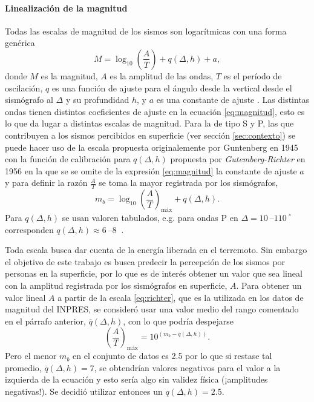 \documentclass[a4paper]{report}
\begin{document}
\paragraph{Linealización de la magnitud}
Todas las escalas de magnitud de los sismos son logarítmicas con una forma genérica
\begin{equation}
	M = \log_{10} \left( \frac{A}{T} \right) + q(\Delta, h) + a,
	\label{eq:magnitud}
\end{equation}
donde \(M\) es la magnitud, \(A\) es la amplitud de las ondas, \(T\) es el período de oscilación, \(q\) es una función de ajuste para el ángulo desde la vertical desde el sismógrafo al \(\Delta\) y su profundidad \(h\), y \(a\) es una constante de ajuste \cite[ecuación 4.13]{fowler_solid_1990}.
Las distintas ondas tienen distintos coeficientes de ajuste en la ecuación \ref{eq:magnitud}, esto es lo que da lugar a distintas escalas de magnitud.
Para la de tipo S y P, las que contribuyen a los sismos percibidos en superficie (ver sección \ref{sec:contexto}) se puede hacer uso de la escala propuesta originalemente por Guntenberg en 1945 con la función de calibración para \(q(\Delta, h)\) propuesta por \emph{Gutemberg-Richter} en 1956 \cite[ecuación 4.18]{fowler_solid_1990} en la que se se omite de la expresión \ref{eq:magnitud} la constante de ajuste \(a\) y para definir la razón \(\frac{A}{T}\) se toma la mayor registrada por los sismógrafos,
\begin{equation}
	m_b = \log_{10} \left( \frac{A}{T} \right)_\text{máx} + q(\Delta, h).
	\label{eq:richter}
\end{equation}
Para \(q(\Delta, h)\) se usan valoren tabulados, e.g. para ondas P en \(\Delta = \SIrange{10}{110}{} ^\circ\) corresponden \(q(\Delta, h) \approx \SIrange{6}{8}{}\) \cite{willian_l_ellsworth_earthquake_1991}.

Toda escala busca dar cuenta de la energía liberada en el terremoto.
Sin embargo el objetivo de este trabajo es busca predecir la percepción de los sismos por personas en la superficie, por lo que es de interés obtener un valor que sea lineal con la amplitud registrada por los sismógrafos en superficie, \(A\).
Para obtener un valor lineal \(A\) a partir de la escala \ref{eq:richter}, que es la utilizada en los datos de magnitud del INPRES, se consideró usar una valor medio del rango comentado en el párrafo anterior, \(\overline{q}(\Delta,h)\), con lo que podría despejarse
\begin{equation}
	\left( \frac{A}{T} \right)_\text{máx} = 10^{(m_b - \overline{q}(\Delta,h) )}.
	\label{eq:linealizacionMagnitud}
\end{equation}
Pero el menor \(m_b\) en el conjunto de datos es \num{2.5} por lo que si restase tal promedio, \(\overline{q}(\Delta,h) = 7\), se obtendrían valores negativos para el valor a la izquierda de la ecuación y esto sería algo sin validez física (¡amplitudes negativas!).
Se decidió utilizar entonces un \(q(\Delta,h) = \num{2.5}\).  
\end{document}

